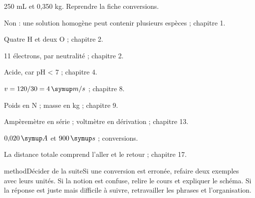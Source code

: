 \label{cor-diagnostic}
\begin{questions}
\item 250 mL et 0,350 kg. Reprendre la fiche conversions.
\item Non : une solution homogène peut contenir plusieurs espèces ; chapitre 1.
\item Quatre H et deux O ; chapitre 2.
\item 11 électrons, par neutralité ; chapitre 2.
\item Acide, car pH < 7 ; chapitre 4.
\item $v=120/30=4\unite{m/s}$ ; chapitre 8.
\item Poids en N ; masse en kg ; chapitre 9.
\item Ampèremètre en série ; voltmètre en dérivation ; chapitre 13.
\item $0{,}020\unite A$ et $900\unite s$ ; conversions.
\item La distance totale comprend l’aller et le retour ; chapitre 17.
\end{questions}
\begin{pcEncadre}{method}{Décider de la suite}Si une conversion est erronée, refaire deux exemples avec leurs unités. Si la notion est confuse, relire le cours et expliquer le schéma. Si la réponse est juste mais difficile à suivre, retravailler les phrases et l’organisation.\end{pcEncadre}
\label{lexique}
